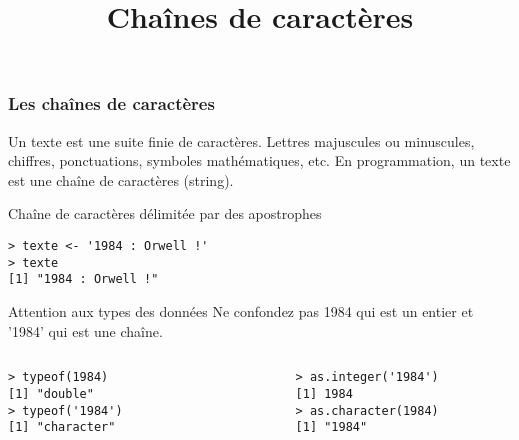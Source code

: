 \documentclass[10pt]{beamer}
\title{Chaînes de caractères}
\begin{document}
\maketitle


\begin{frame}[fragile]
  \frametitle{Les chaînes de caractères}
  \begin{block}{Un texte est une suite finie de caractères.}
    Lettres majuscules ou minuscules, chiffres, ponctuations, symboles mathématiques, etc.
    En programmation, un texte est une chaîne de caractères (\alert{string}).
  \end{block}

\begin{block}{Chaîne de caractères délimitée par des apostrophes}
  \begin{lstlisting}[style=edblock]
> texte <- '1984 : Orwell !'
> texte
[1] "1984 : Orwell !"    
  \end{lstlisting}
\end{block}

\begin{exampleblock}{Attention aux types des données}
  Ne confondez pas 1984 qui est un entier et '1984' qui est une chaîne.
  \begin{columns}[t]
    \begin{column}{0.48\textwidth}
      \begin{lstlisting}
> typeof(1984)
[1] "double"
> typeof('1984')
[1] "character"            
      \end{lstlisting}
\end{column}
\begin{column}{0.48\textwidth}
  \begin{lstlisting}
> as.integer('1984')
[1] 1984
> as.character(1984)
[1] "1984"    
  \end{lstlisting}
\end{column}
\end{columns}

\end{exampleblock}
\end{frame}
\end{document}
